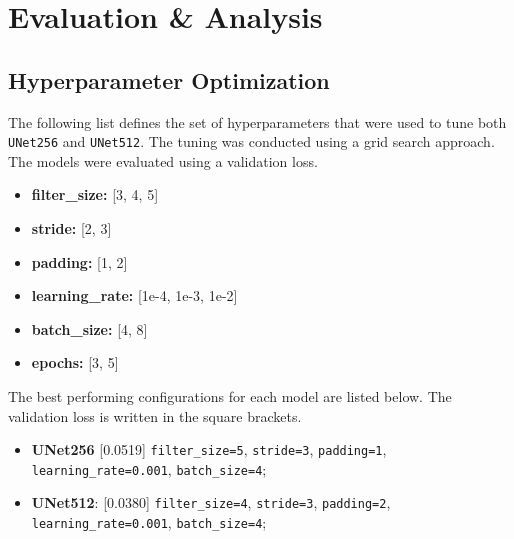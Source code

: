 \section{Evaluation \& Analysis}\label{sec:evaluation}

\subsection{Hyperparameter Optimization}

The following list defines the set of hyperparameters that were used to tune both
\texttt{UNet256} and \texttt{UNet512}. The tuning was conducted using a grid search
approach. The models were evaluated using a validation loss.

\begin{itemize}
    \item \textbf{filter\_size:} [3, 4, 5]
    \item \textbf{stride:} [2, 3]
    \item \textbf{padding:} [1, 2]
    \item \textbf{learning\_rate:} [1e-4, 1e-3, 1e-2]
    \item \textbf{batch\_size:} [4, 8]
    \item \textbf{epochs:} [3, 5]
\end{itemize}

The best performing configurations for each model are listed below. The validation loss is 
written in the square brackets.

\begin{itemize}
    \item \textbf{UNet256} [0.0519] \newline
          \texttt{filter\_size=5}, \newline
          \texttt{stride=3}, \newline
          \texttt{padding=1}, \newline
          \texttt{learning\_rate=0.001}, \newline
          \texttt{batch\_size=4}; \newline
    \item \textbf{UNet512}: [0.0380] \newline
          \texttt{filter\_size=4}, \newline
          \texttt{stride=3}, \newline
          \texttt{padding=2}, \newline
          \texttt{learning\_rate=0.001}, \newline
          \texttt{batch\_size=4}; \newline
\end{itemize}


